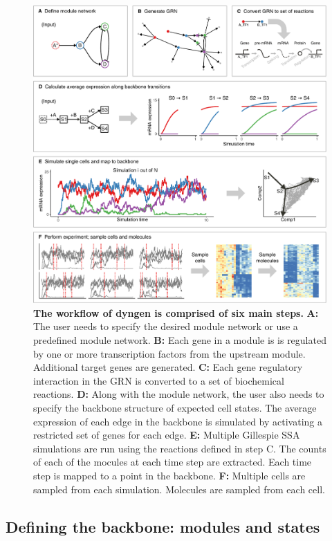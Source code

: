 \begin{figure}[htb!]
	\centering
	\includegraphics[width=\hugefigure]{fig/explain_methods} 
	\caption{\textbf{The workflow of dyngen is comprised of six main steps.} \textbf{A:} The user needs to specify the desired module network or use a predefined module network. \textbf{B:} Each gene in a module is is regulated by one or more transcription factors from the upstream module. Additional target genes are generated. \textbf{C:} Each gene regulatory interaction in the GRN is converted to a set of biochemical reactions. \textbf{D:} Along with the module network, the user also needs to specify the backbone structure of expected cell states. The average expression of each edge in the backbone is simulated by activating a restricted set of genes for each edge. \textbf{E:} Multiple Gillespie SSA simulations are run using the reactions defined in step C.  The counts of each of the mocules at each time step are extracted. Each time step is mapped to a point in the backbone. \textbf{F:} Multiple cells are sampled from each simulation. Molecules are sampled from each cell.}
	\label{fig:explain_methods}
\end{figure}

\subsection{Defining the backbone: modules and states} \label{sec:backbone}

